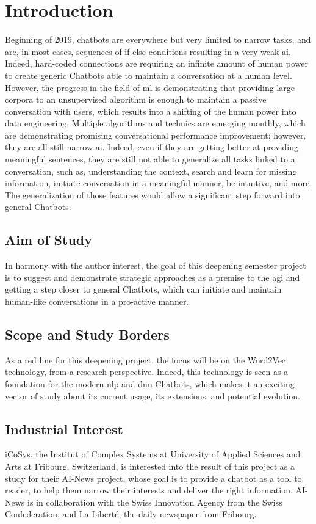 \chapter{Introduction}
\label{chap:introduction}

Beginning of 2019, chatbots are everywhere but very limited to narrow tasks, and are, in most cases, sequences of if-else conditions resulting in a very weak \gls{ai}. Indeed, hard-coded connections are requiring an infinite amount of human power to create generic Chatbots able to maintain a conversation at a human level. However, the progress in the field of \gls{ml} is demonstrating that providing large corpora to an unsupervised algorithm is enough to maintain a passive conversation with users, which results into a shifting of the human power into data engineering. Multiple algorithms and technics are emerging monthly, which are demonstrating promising conversational performance improvement; however, they are all still narrow \acrshort{ai}. Indeed, even if they are getting better at providing meaningful sentences, they are still not able to generalize all tasks linked to a conversation, such as, understanding the context, search and learn for missing information, initiate conversation in a meaningful manner, be intuitive, and more. The generalization of those features would allow a significant step forward into general Chatbots.

\section{Aim of Study}
In harmony with the author interest, the goal of this deepening semester project is to suggest and demonstrate strategic approaches as a premise to the \acrshort{agi} and getting a step closer to general Chatbots, which can initiate and maintain human-like conversations in a pro-active manner.

\section{Scope and Study Borders}
As a red line for this deepening project, the focus will be on the Word2Vec technology, from a research perspective. Indeed, this technology is seen as a foundation for the modern \acrshort{nlp} and \acrshort{dnn} Chatbots, which makes it an exciting vector of study about its current usage, its extensions, and potential evolution. 

\section{Industrial Interest}
iCoSys, the Institut of Complex Systems at University of Applied Sciences and Arts at Fribourg, Switzerland, is interested into the result of this project as a study for their AI-News project, whose goal is to provide a chatbot as a tool to reader, to help them narrow their interests and deliver the right information. AI-News is in collaboration with the Swiss Innovation Agency from the Swiss Confederation, and La Liberté, the daily newspaper from Fribourg. 